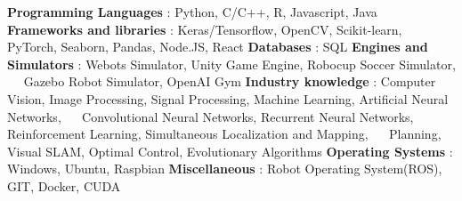\begin{cventries}  
\skillentry
    {
    \bullet \space \textbf{Programming Languages} : Python, C/C++, R, Javascript, Java \newline
    \bullet \space \textbf{Frameworks and libraries} : Keras/Tensorflow, OpenCV, Scikit-learn, PyTorch, Seaborn, Pandas, Node.JS, React \newline
    \bullet \space \textbf{Databases} : SQL \newline
    \bullet \space \textbf{Engines and Simulators} : Webots Simulator, Unity Game Engine, Robocup Soccer Simulator, \newline $\quad$ Gazebo Robot Simulator, OpenAI Gym \newline
    \bullet \space \textbf{Industry knowledge} : Computer Vision, Image Processing, Signal Processing, Machine Learning, Artificial Neural Networks, \newline $\quad$ Convolutional Neural Networks, Recurrent Neural Networks, Reinforcement Learning, Simultaneous Localization and Mapping, \newline $\quad$ Planning, Visual SLAM, Optimal Control, Evolutionary Algorithms   \newline
    \bullet \space \textbf{Operating Systems} : Windows, Ubuntu, Raspbian \newline
    \bullet \space \textbf{Miscellaneous} : Robot Operating System(ROS), GIT, Docker, CUDA
    }
\end{cventries}
